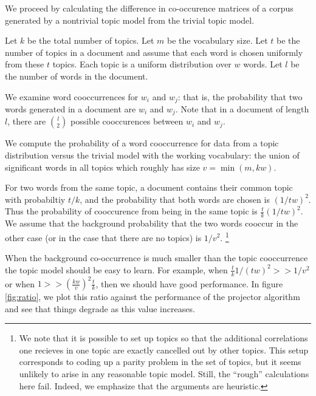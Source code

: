 We proceed by calculating the difference in co-occurence matrices of a
corpus generated by a nontrivial topic model from the trivial topic
model.

Let $k$ be the total number of topics. Let $m$ be the vocabulary size. Let
$t$ be the number of topics in a document and assume that 
each word is chosen uniformly from these $t$ topics. Each topic is a
uniform distribution over $w$ words. 
Let $l$ be the number of words in the document.

We examine word cooccurrences for $w_i$ and $w_j$: that is, the
probability that two words generated in a document are $w_i$ and
$w_j$.  Note that in a document of length $l$, there are ${l \choose
2}$ possible cooccurences between $w_i$ and $w_j$.

We compute the probability of a word cooccurrence for data from a
topic distribution versus  the trivial model with the working
vocabulary: the union of significant words in all topics which roughly has
size $v = \min(m,kw)$.

For two words from the same topic, a document contains their common
topic with probabiltiy $t/k$, and the probability that both words are
chosen is $(1/tw)^2$. Thus the probability of cooccurence from being
in the same topic is $\frac{t}{k} (1/tw)^2$.  We assume that the background
probability that the two words cooccur in the other case (or in the
case that there are no topics) is $1/v^2$.  \footnote{We note that it
is possible to set up topics so that the additional correlations one
recieves in one topic are exactly cancelled out by other topics.  This
setup corresponds to coding up a parity problem in the set of topics,
but it seems unlikely to arise in any reasonable topic model.  Still,
the ``rough'' calculations here fail. Indeed, we emphasize that the
arguments are heuristic.}

When the background co-occurrence is much smaller than the
topic cooccurrence the topic model should be easy to learn.  For
example, when $\frac{t}{k}{1/(tw)^2} >> 1/v^2$ or when $1 >>
(\frac{kw}{v})^2 \frac{t}{k}$, then we should have good
performance. In figure \ref{fig:ratio}, we plot this ratio against the
performance of the projector algorithm and see that things degrade as
this value increases.


